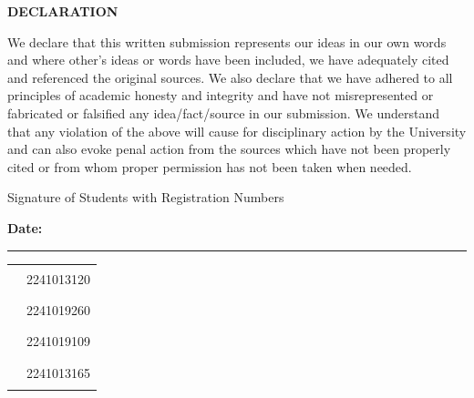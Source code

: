 \begin{center}{\Large\bfseries DECLARATION}\end{center}
\vspace{1em}

We declare that this written submission represents our ideas in our own words and where other's ideas or words have been included, we have adequately cited and referenced the original sources. We also declare that we have adhered to all principles of academic honesty and integrity and have not misrepresented or fabricated or falsified any idea/fact/source in our submission. We understand that any violation of the above will cause for disciplinary action by the University and can also evoke penal action from the sources which have not been properly cited or from whom proper permission has not been taken when needed.

\vspace{2em}

Signature of Students with Registration Numbers

\textbf{Date:} \rule{4cm}{0.4pt}

\vspace{1.5em}
\noindent\begin{tabular}{p{6cm}p{5cm}}
\rule{5cm}{0.4pt} & 2241013120\\[1.2em]
\rule{5cm}{0.4pt} & 2241019260\\[1.2em]
\rule{5cm}{0.4pt} & 2241019109\\[1.2em]
\rule{5cm}{0.4pt} & 2241013165\\
\end{tabular}
\newpage
